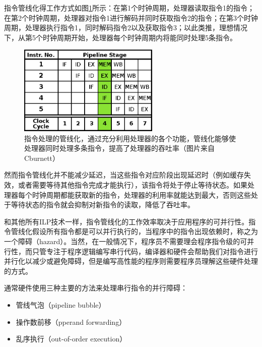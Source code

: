 指令管线化得工作方式如图\ref{f:rp-5-Stage-Pipeline}所示：在第1个时钟周期，处理器读取指令1的指令；在第2个时钟周期，处理器对指令1进行解码并同时获取指令2的指令；在第3个时钟周期，处理器执行指令1，同时解码指令2以及获取指令3；以此类推，理想情况下，从第5个时钟周期开始，处理器每个时钟周期内将能同时处理5条指令。

\begin{figure}
	\sidecaption
	\includegraphics[width=0.6\textwidth]{figures/rp/5-Stage-Pipeline}
	\caption{指令处理的管线化，通过充分利用处理器的各个功能，管线化能够使处理器同时处理多条指令，提高了处理器的吞吐率（图片来自Cburnett）}
	\label{f:rp-5-Stage-Pipeline}
\end{figure}

然而指令管线化并不能减少延迟，当这些指令对应阶段出现延迟时（例如缓存失效，或者需要等待其他指令完成才能执行），该指令将处于停止等待状态。如果处理器每个时钟周期都能获取新的指令，处理器的利用率就能达到最大，否则这些处于等待状态的指令就会抑制对新指令的读取，降低了吞吐率。

和其他所有ILP技术一样，指令管线化的工作效率取决于应用程序的可并行性。指令管线化假设所有指令都是可以并行执行的，当程序中的指令出现依赖时，称之为一个障碍（hazard）。当然，在一般情况下，程序员不需要理会程序指令级的可并行性，而只管专注于程序逻辑编写串行代码，编译器和硬件会帮助我们对指令进行并行化以减少或避免障碍，但是编写高性能的程序则需要程序员理解这些硬件处理的方式。

通常硬件使用三种主要的方法来处理串行指令的并行障碍：

\begin{itemize}
	\item 管线气泡（pipeline bubble）
	\item 操作数前移（pperand forwarding）
	\item 乱序执行（out-of-order execution）
\end{itemize}




